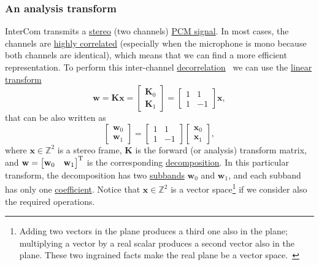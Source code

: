\subsubsection{An analysis transform}
InterCom transmits a
\href{https://en.wikipedia.org/wiki/Stereophonic_sound}{stereo} (two
channels)
\href{https://en.wikipedia.org/wiki/Pulse-code_modulation}{PCM
  signal}. In most cases, the channels are
\href{https://en.wikipedia.org/wiki/Binaural_recording}{highly
  correlated} (especially when the microphone is mono because both
channels are identical), which means that we can find a more efficient
representation. To perform this inter-channel
\href{https://en.wikipedia.org/wiki/Decorrelation}{decorrelation}~\cite{thinkstats}
we can use the \href{https://en.wikipedia.org/wiki/Linear_map}{linear
  transform}~\cite{strang4linear}
\begin{equation}
  {\mathbf w} = {\mathbf K}{\mathbf x} =
\begin{bmatrix} \mathbf{K}_0 \\ \mathbf{K}_1 \end{bmatrix} =
\begin{bmatrix} 1 & 1 \\ 1 & -1 \end{bmatrix}
{\mathbf x},
  \label{eq:forward_transform_matrix_form}
\end{equation}
that can be also written as
\begin{equation}
  \begin{bmatrix}
    {\mathbf w}_0 \\
    {\mathbf w}_1
  \end{bmatrix}
  = 
  \begin{bmatrix} 1 & 1 \\ 1 & -1 \end{bmatrix}
  \begin{bmatrix}
    {\mathbf x}_0 \\
    {\mathbf x}_1
  \end{bmatrix},
  \label{eq:forward_transform_matrix_form2}
\end{equation}
where ${\mathbf x}\in\mathbb{Z}^2$ is a stereo frame, ${\mathbf K}$ is
the forward (or analysis) transform matrix, and
${\mathbf w}=\begin{bmatrix} {\mathbf w}_0 & {\mathbf
    w}_1\end{bmatrix}^{\text T}$ is the corresponding
\href{https://en.wikipedia.org/wiki/Discrete_wavelet_transform}{decomposition}. In
this particular transform, the decomposition has two
\href{https://en.wikipedia.org/wiki/Sub-band_coding}{subbands}
${\mathbf w}_0$ and ${\mathbf w}_1$, and each subband has only one
\href{https://web.stanford.edu/class/ee398a/handouts/lectures/07-TransformCoding.pdf}{coefficient}. Notice
that ${\mathbf x}\in\mathbb{Z}^2$ is a vector space\footnote{Adding
  two vectors in the plane produces a third one also in the plane;
  multiplying a vector by a real scalar produces a second vector also
  in the plane. These two ingrained facts make the real plane be a
  vector space.~\cite{vetterli2014foundations}} if we consider also
the required operations.

